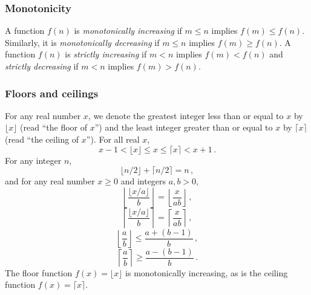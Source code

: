\documentclass{report}
\begin{document}
        \subsubsection{Monotonicity}
        \bigbreak \noindent 
        A function \( f(n) \) is \textit{monotonically increasing} if \( m \leq n \) implies \( f(m) \leq f(n) \).
        Similarly, it is \textit{monotonically decreasing} if \( m \leq n \) implies \( f(m) \geq f(n) \). 
        A function \( f(n) \) is \textit{strictly increasing} if \( m < n \) implies \( f(m) < f(n) \) and 
        \textit{strictly decreasing} if \( m < n \) implies \( f(m) > f(n) \).
        \bigbreak \noindent 
        \subsubsection{Floors and ceilings}
        \bigbreak \noindent 
        For any real number \( x \), we denote the greatest integer less than or equal to \( x \) by \( \lfloor x \rfloor \)
        (read “the floor of \( x \)”) and the least integer greater than or equal to \( x \) by \( \lceil x \rceil \) (read
        “the ceiling of \( x \)”). For all real \( x \),
        \[
            x - 1 < \lfloor x \rfloor \leq x \leq \lceil x \rceil < x + 1 \, . \tag{3.3}
        \]
        For any integer \( n \),
        \[
            \lfloor n/2 \rfloor + \lceil n/2 \rceil = n \, ,
        \]
        and for any real number \( x \geq 0 \) and integers \( a, b > 0 \),
        \[
            \left\lfloor \frac{\lfloor x/a \rfloor}{b} \right\rfloor = \left\lfloor \frac{x}{ab} \right\rfloor \, , \tag{3.4}
        \]
        \[
            \left\lceil \frac{\lfloor x/a \rfloor}{b} \right\rceil = \left\lceil \frac{x}{ab} \right\rceil \, , \tag{3.5}
        \]
        \[
            \left\lfloor \frac{a}{b} \right\rfloor \leq \frac{a + (b - 1)}{b} \, , \tag{3.6}
        \]
        \[
            \left\lceil \frac{a}{b} \right\rceil \geq \frac{a - (b - 1)}{b} \, . \tag{3.7}
        \]
        The floor function \( f(x) = \lfloor x \rfloor \) is monotonically increasing, as is the ceiling function \( f(x) = \lceil x \rceil \).

        \bigbreak \noindent 
\end{document}
